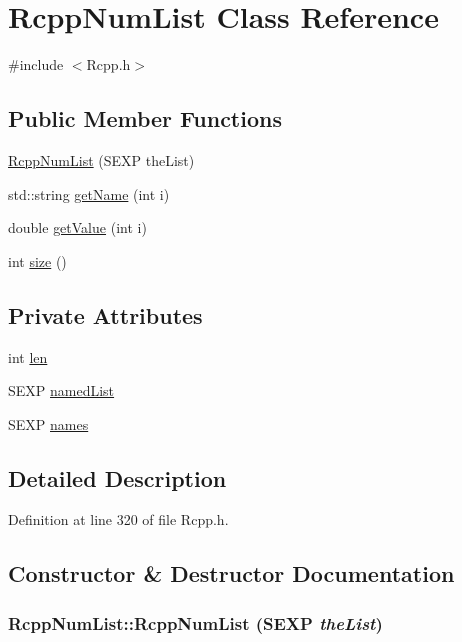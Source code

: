 \hypertarget{classRcppNumList}{
\section{RcppNumList Class Reference}
\label{classRcppNumList}
}


{\ttfamily \#include $<$Rcpp.h$>$}\subsection*{Public Member Functions}
\begin{DoxyCompactItemize}
\item 
\hyperlink{classRcppNumList_a4a8a321d0dc84b6d4be988005fa74fcd}{RcppNumList} (SEXP theList)
\item 
std::string \hyperlink{classRcppNumList_a246d8e534d97fbe798b8567bbfa93ca7}{getName} (int i)
\item 
double \hyperlink{classRcppNumList_a2e83950933ddc73ad64ed800f6f5e23b}{getValue} (int i)
\item 
int \hyperlink{classRcppNumList_a18dc0660cc827bcf17d9738cb5874db7}{size} ()
\end{DoxyCompactItemize}
\subsection*{Private Attributes}
\begin{DoxyCompactItemize}
\item 
int \hyperlink{classRcppNumList_ac4cb5c784f7105f0f28ae48d02deb3a1}{len}
\item 
SEXP \hyperlink{classRcppNumList_a7464927aafe555a0c4a104247dba7185}{namedList}
\item 
SEXP \hyperlink{classRcppNumList_aa669b28cba0c95531a3c92910a60ecb0}{names}
\end{DoxyCompactItemize}


\subsection{Detailed Description}


Definition at line 320 of file Rcpp.h.

\subsection{Constructor \& Destructor Documentation}
\hypertarget{classRcppNumList_a4a8a321d0dc84b6d4be988005fa74fcd}{
\subsubsection[{RcppNumList}]{\setlength{\rightskip}{0pt plus 5cm}RcppNumList::RcppNumList (SEXP {\em theList})}}
\label{classRcppNumList_a4a8a321d0dc84b6d4be988005fa74fcd}


